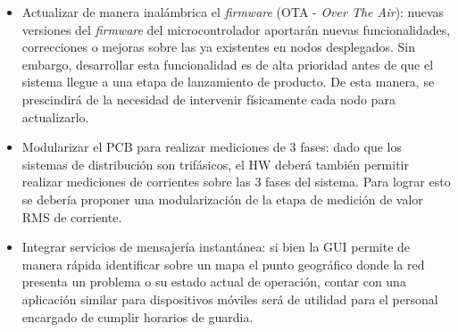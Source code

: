 \begin{itemize}
	\item Actualizar de manera inalámbrica el \textit{firmware} (OTA - \textit{Over The Air}): nuevas versiones del \textit{firmware} del microcontrolador aportarán nuevas funcionalidades, correcciones o mejoras sobre las ya existentes en nodos desplegados. Sin embargo, desarrollar esta funcionalidad es de alta prioridad antes de que el sistema llegue a una etapa de lanzamiento de producto. De esta manera, se prescindirá de la necesidad de intervenir físicamente cada nodo para actualizarlo.\\
	\item Modularizar el PCB para realizar mediciones de 3 fases: dado que los sistemas de distribución son trifásicos, el HW deberá también permitir realizar mediciones de corrientes sobre las 3 fases del sistema. Para lograr esto se debería proponer una modularización de la etapa de medición de valor RMS de corriente.\\
	\item Integrar servicios de mensajería instantánea: si bien la GUI permite de manera rápida identificar sobre un mapa el punto geográfico donde la red presenta un problema o su estado actual de operación, contar con una aplicación similar para dispositivos móviles será de utilidad para el personal encargado de cumplir horarios de guardia.\\
	
\end{itemize}

